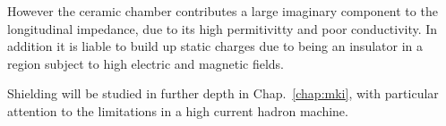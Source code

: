 However the ceramic chamber contributes a large imaginary component to the longitudinal impedance, due to its high permitivitty and poor conductivity. In addition it is liable to build up static charges due to being an insulator in a region subject to high electric and magnetic fields.

Shielding will be studied in further depth in Chap.~\ref{chap:mki}, with particular attention to the limitations in a high current hadron machine.
